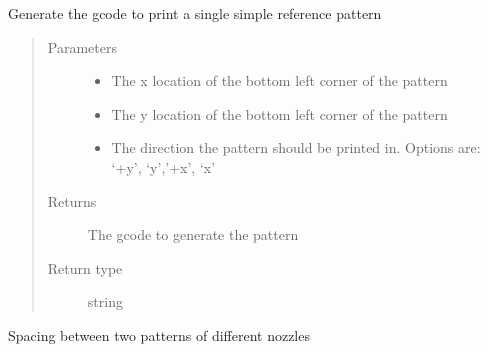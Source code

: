 \documentclass[letterpaper,10pt,english]{sphinxmanual}
\begin{document}
\begin{fulllineitems}
\begin{fulllineitems}
\end{fulllineitems}


\begin{fulllineitems}
\label{\detokenize{index:calibration_pattern.calibration_pattern.single_pattern}}
\sphinxAtStartPar
Generate the gcode to print a single simple reference pattern
\begin{quote}\begin{description}
\item[{Parameters}] \leavevmode\begin{itemize}
\item {} 
\sphinxAtStartPar
{} \textendash{} The x location of the bottom left corner of the pattern

\item {} 
\sphinxAtStartPar
{} \textendash{} The y location of the bottom left corner of the pattern

\item {} 
\sphinxAtStartPar
{} \textendash{} The direction the pattern should be printed in. Options are: ‘+y’, ‘\sphinxhyphen{}y’,’+x’, ‘\sphinxhyphen{}x’

\end{itemize}

\item[{Returns}] \leavevmode
\sphinxAtStartPar
The gcode to generate the pattern

\item[{Return type}] \leavevmode
\sphinxAtStartPar
string

\end{description}\end{quote}

\end{fulllineitems}


\begin{fulllineitems}
\label{\detokenize{index:calibration_pattern.calibration_pattern.spacing}}
\sphinxAtStartPar
Spacing between two patterns of different nozzles


\end{fulllineitems}
\end{fulllineitems}
\end{document}
